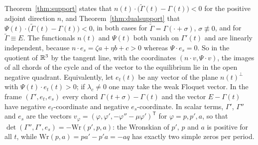 \begin{remark}\label{wk:rem:double}
Theorem~\ref{thm:support} states that $n(t)\cdot\bigl(\tilde\Gamma(t)-\Gamma(t)\bigr)<0$ for the positive adjoint direction $n$, and Theorem~\ref{thm:dualsupport} that $\Psi(t)\cdot\bigl(\tilde\Gamma(t)-\Gamma(t)\bigr)<0$, in both cases for $\tilde\Gamma=\Gamma(\cdot+\sigma)$, $\sigma\not\equiv0$, and for $\tilde\Gamma\equiv E$. The functionals $n(t)$ and $\Psi(t)$ both vanish on $\Gamma'(t)$ and are linearly independent, because $n\cdot e_s=\zeta a+\eta b+c>0$ whereas $\Psi\cdot e_s=0$. So in the quotient of $\mathbb R^3$ by the tangent line, with the coordinates $(n\cdot v,\Psi\cdot v)$, the images of all chords of the cycle and of the vector to the equilibrium lie in the open negative quadrant. Equivalently, let $e_t(t)$ be any vector of the plane $n(t)^\perp$ with $\Psi(t)\cdot e_t(t)>0$; if $\lambda_c\ne0$ one may take the weak Floquet vector. In the frame $(\Gamma',e_t,e_s)$ every chord $\Gamma(t+\sigma)-\Gamma(t)$ and the vector $E-\Gamma(t)$ have negative $e_t$-coordinate and negative $e_s$-coordinate. In scalar terms, $\Gamma'$, $\Gamma''$ and $e_s$ are the vectors $v_\varphi=(\varphi,\varphi',-\varphi''-\mu\varphi')^{\mathsf T}$ for $\varphi=p,p',a$, so that $\det(\Gamma'',\Gamma',e_s)=-\mathrm{Wr}(p',p,a)$: the Wronskian of $p'$, $p$ and $a$ is positive for all $t$, while $\mathrm{Wr}(p,a)=pa'-p'a=-aq$ has exactly two simple zeros per period.
\end{remark}

